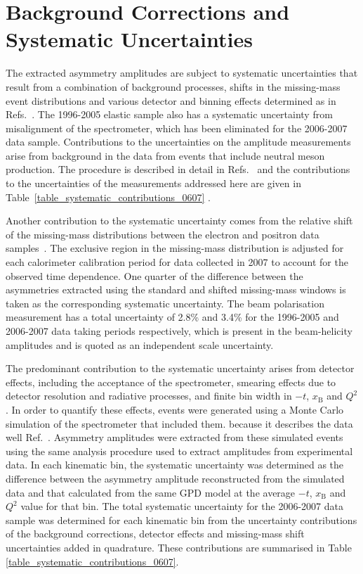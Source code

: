 \section{Background Corrections and Systematic Uncertainties}
The extracted asymmetry amplitudes are subject to systematic uncertainties that
result from a combination of background processes, 
shifts in the missing-mass event distributions and various detector and binning
effects determined as in Refs.~\cite{Air08,Air09}. The
1996-2005 elastic sample also has a systematic uncertainty from misalignment of the spectrometer, which has been eliminated for the 2006-2007 data sample. Contributions to the uncertainties on the amplitude measurements arise from background in the data from events that include neutral meson production. The procedure is described in detail in Refs.~\cite{Air08,Air09} and the contributions to the uncertainties of the measurements addressed here are given in Table~\ref{table_systematic_contributions_0607} . 

Another contribution to the systematic uncertainty comes from the relative shift of the
missing-mass distributions between the electron and positron data
samples~\cite{Zei09,Bur10}. The exclusive region in the missing-mass
distribution is adjusted for each calorimeter calibration period for data
collected in 2007 to account for the observed time dependence. One
quarter of the difference between the asymmetries extracted using the standard
and shifted missing-mass windows is taken as the corresponding systematic
uncertainty. The beam polarisation measurement has a total uncertainty of 2.8\% and 3.4\% for the 1996-2005 and 2006-2007 data taking periods respectively,
which is present in the beam-helicity amplitudes and is quoted as an
independent scale uncertainty.

The predominant contribution to the systematic uncertainty arises from detector
effects, including the acceptance of the spectrometer, smearing effects due to detector resolution and radiative processes, and
finite bin width in $-t$, $x_{\textrm{B}}$ and $Q^{2}$. In order to quantify
these effects, events were generated using a Monte Carlo simulation of
the spectrometer that included them.  because it describes the data well  Ref.~\cite{Air09}. Asymmetry amplitudes were extracted from these simulated events using the same analysis
procedure used to extract amplitudes from experimental data. In each kinematic
bin, the systematic uncertainty was determined as the difference between the
asymmetry amplitude reconstructed from the simulated data and that
calculated from the same GPD model at the average $-t$, $x_{\textrm{B}}$ and
$Q^{2}$ value for that bin.
The total systematic uncertainty for the 2006-2007 data sample was
determined for each kinematic bin from the uncertainty contributions of the
background corrections, detector effects and missing-mass shift
uncertainties added in quadrature. These contributions are summarised in Table
\ref{table_systematic_contributions_0607}.

